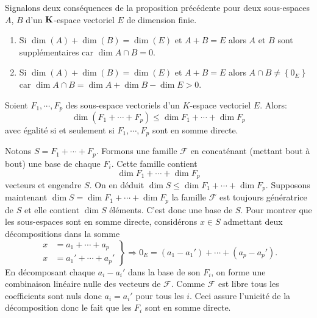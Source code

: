 \begin{rem} Signalons deux conséquences de la proposition précédente pour deux sous-espaces $A$, $B$ d'un $\mathbf{K}$-espace vectoriel $E$ de dimension finie.
  \begin{enumerate}
    \item Si $\dim(A) + \dim(B) = \dim(E)$ et $A + B= E$ alors $A$ et $B$ sont supplémentaires car $\dim A\cap B = 0$.
    \item Si $\dim(A) + \dim(B) = \dim(E)$ et $A + B= E$ alors $A\cap B \neq \left\lbrace 0_E \right\rbrace$ car 
$\dim A\cap B = \dim A + \dim B - \dim E > 0$.
  \end{enumerate}
\end{rem}

\begin{propn}
  Soient $F_1,\cdots, F_p$ des sous-espace vectoriels d'un $K$-espace vectoriel $E$. Alors:
\begin{displaymath}
  \dim\left( F_1 + \cdots + F_p\right) \leq \dim F_1 + \cdots + \dim F_p
\end{displaymath}
avec égalité si et seulement si $F_1,\cdots, F_p$ sont en somme directe.
\end{propn}
\begin{demo}
 Notons $S = F_1 + \cdots + F_p$. Formons une famille $\mathcal{F}$ en concaténant (mettant bout à bout) une base de chaque $F_i$. Cette famille contient 
\begin{displaymath}
  \dim F_1 + \cdots + \dim F_p
\end{displaymath}
 vecteurs et engendre $S$. On en déduit $\dim S \leq \dim F_1 + \cdots + \dim F_p$. \newline
Supposons maintenant $\dim S = \dim F_1 + \cdots + \dim F_p$ la famille $\mathcal{F}$ est toujours génératrice de $S$ et elle contient $\dim S$ éléments. C'est donc une base de $S$. Pour montrer que les sous-espaces sont en somme directe, considérons $x \in S$ admettant deux décompositions dans la somme
\begin{displaymath}
\left. 
  \begin{aligned}
    x &= a_1 + \cdots +a_p \\ x &= a_1' + \cdots +a_p'
  \end{aligned}
\right\rbrace \Rightarrow 0_E = (a_1-a_1') + \cdots + (a_p -a_p').
\end{displaymath}
En décomposant chaque $a_i - a_i'$ dans la base de son $F_i$, on forme une combinaison linéaire nulle des vecteurs de $\mathcal{F}$. Comme $\mathcal{F}$ est libre tous les coefficients sont nuls donc $a_i= a_i'$ pour tous les $i$. Ceci assure l'unicité de la décomposition donc le fait que les $F_i$ sont en somme directe.
\end{demo}


